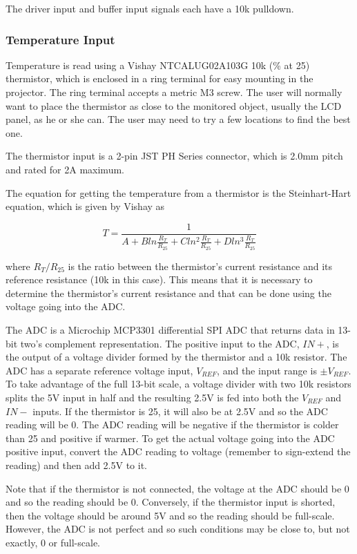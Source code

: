 \documentclass{article}
\begin{document}
The driver input and buffer input signals each have a 10k\textOmega{} pulldown.

\subsubsection{Temperature Input} \label{sssec:TempInput}
Temperature is read using a Vishay NTCALUG02A103G 10k (\% at 25\textcelsius) thermistor,
which is enclosed in a ring terminal for easy mounting in the projector.  The ring terminal accepts
a metric M3 screw.  The user will normally want to place the thermistor as close to the monitored
object, usually the LCD panel, as he or she can.  The user may need to try a few locations to find
the best one.

The thermistor input is a 2-pin JST PH Series connector, which is 2.0mm pitch and rated for 2A maximum.

The equation for getting the temperature from a thermistor is the Steinhart-Hart equation, which is
given by Vishay as

\[
T = \frac{1}{A + Bln\frac{R_T}{R_{25}} + Cln^2\frac{R_T}{R_{25}} + Dln^3\frac{R_T}{R_{25}}}
\]

where $R_T/R_{25}$ is the ratio between the thermistor's current resistance and its reference
resistance (10k\textOmega{} in this case).  This means that it is necessary to determine the
thermistor's current resistance and that can be done using the voltage going into the ADC.

The ADC is a Microchip MCP3301 differential SPI ADC that returns data in 13-bit two's complement
representation.  The positive input to the ADC, $IN+$, is the output of a voltage divider formed by
the thermistor and a 10k\textOmega{} resistor.  The ADC has a separate reference voltage input,
$V_{REF}$, and the input range is $\pm V_{REF}$.  To take advantage of the full 13-bit scale, a
voltage divider with two 10k\textOmega{} resistors splits the 5V input in half and the resulting
2.5V is fed into both the $V_{REF}$ and $IN-$ inputs.  If the thermistor is 25\textcelsius{}, it
will also be at 2.5V and so the ADC reading will be 0.  The ADC reading will be negative if the
thermistor is colder than 25\textcelsius{} and positive if warmer.  To get the actual voltage going
into the ADC positive input, convert the ADC reading to voltage (remember to sign-extend the
reading) and then add 2.5V to it.

Note that if the thermistor is not connected, the voltage at the ADC should be 0 and so the reading
should be 0.  Conversely, if the thermistor input is shorted, then the voltage should be around 5V
and so the reading should be full-scale.  However, the ADC is not perfect and so such conditions may
be close to, but not exactly, 0 or full-scale.
\end{document}
